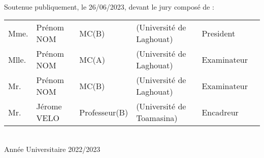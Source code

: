 \begin{titlepage}
\begin{center}
		\large{ \ \\Soutenue publiquement, le 26/06/2023, devant le jury composé de :}
		\begin{flushleft} \small
			\begin{tabular}{llllll}
				Mme.  & Prénom NOM  & MC(B)         & (Université de Laghouat)  & President   \\
				Mlle. & Prénom NOM  & MC(A)         & (Université de Laghouat)  & Examinateur \\
				Mr.   & Prénom NOM  & MC(B)         & (Université de Laghouat)  & Examinateur \\
				Mr.   & Jérome VELO & Professeur(B) & (Université de Toamasina) & Encadreur   \\
			\end{tabular}
		\end{flushleft}
		\vspace{0.15cm}
		\large{ \ \\Année Universitaire 2022/2023}
		\vfill
	\end{center}
\end{titlepage}